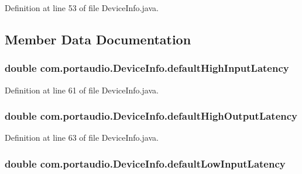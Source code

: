 Definition at line 53 of file Device\+Info.\+java.



\subsection{Member Data Documentation}
\subsubsection[{\texorpdfstring{default\+High\+Input\+Latency}{defaultHighInputLatency}}]{\setlength{\rightskip}{0pt plus 5cm}double com.\+portaudio.\+Device\+Info.\+default\+High\+Input\+Latency}\hypertarget{classcom_1_1portaudio_1_1_device_info_a26851d2e68027020ed26e63d53d0a536}{}\label{classcom_1_1portaudio_1_1_device_info_a26851d2e68027020ed26e63d53d0a536}


Definition at line 61 of file Device\+Info.\+java.

\subsubsection[{\texorpdfstring{default\+High\+Output\+Latency}{defaultHighOutputLatency}}]{\setlength{\rightskip}{0pt plus 5cm}double com.\+portaudio.\+Device\+Info.\+default\+High\+Output\+Latency}\hypertarget{classcom_1_1portaudio_1_1_device_info_a24a8f3ef139f4a7eeaac28f284a72500}{}\label{classcom_1_1portaudio_1_1_device_info_a24a8f3ef139f4a7eeaac28f284a72500}


Definition at line 63 of file Device\+Info.\+java.

\subsubsection[{\texorpdfstring{default\+Low\+Input\+Latency}{defaultLowInputLatency}}]{\setlength{\rightskip}{0pt plus 5cm}double com.\+portaudio.\+Device\+Info.\+default\+Low\+Input\+Latency}\hypertarget{classcom_1_1portaudio_1_1_device_info_a5cb2e27dea2b8db87332b94cc6e3ff7b}{}\label{classcom_1_1portaudio_1_1_device_info_a5cb2e27dea2b8db87332b94cc6e3ff7b}


